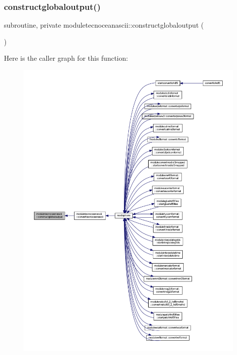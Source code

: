 \subsubsection{\texorpdfstring{constructglobaloutput()}{constructglobaloutput()}}
{\footnotesize\ttfamily subroutine, private moduletecnoceanascii\+::constructglobaloutput (\begin{DoxyParamCaption}{ }\end{DoxyParamCaption})\hspace{0.3cm}{\ttfamily [private]}}

Here is the caller graph for this function\+:\nopagebreak
\begin{figure}[H]
\begin{center}
\leavevmode
\includegraphics[width=350pt]{namespacemoduletecnoceanascii_ac3c04e7c0109f285ad61e9110701e6ce_icgraph}
\end{center}
\end{figure}
\mbox{\label{namespacemoduletecnoceanascii_a911ff8ebfeb289d3cf85e2a5a6543289}} 

